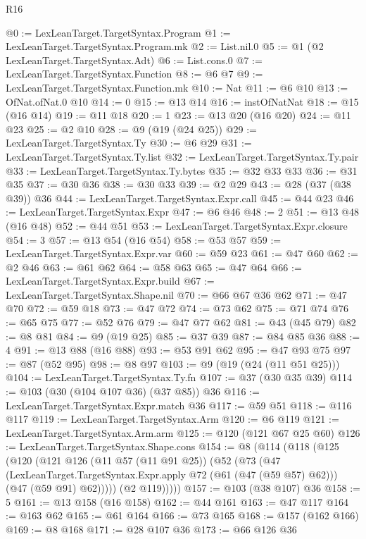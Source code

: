 \begin{lexlean}{R16}
\begin{coremodule}
@0 := LexLeanTarget.TargetSyntax.Program
@1 := LexLeanTarget.TargetSyntax.Program.mk
@2 := List.nil.{0}
@5 := @1 (@2 LexLeanTarget.TargetSyntax.Adt)
@6 := List.cons.{0}
@7 := LexLeanTarget.TargetSyntax.Function
@8 := @6 @7
@9 := LexLeanTarget.TargetSyntax.Function.mk
@10 := Nat
@11 := @6 @10
@13 := OfNat.ofNat.{0} @10
@14 := 0
@15 := @13 @14
@16 := instOfNatNat
@18 := @15 (@16 @14)
@19 := @11 @18
@20 := 1
@23 := @13 @20 (@16 @20)
@24 := @11 @23
@25 := @2 @10
@28 := @9 (@19 (@24 @25))
@29 := LexLeanTarget.TargetSyntax.Ty
@30 := @6 @29
@31 := LexLeanTarget.TargetSyntax.Ty.list
@32 := LexLeanTarget.TargetSyntax.Ty.pair
@33 := LexLeanTarget.TargetSyntax.Ty.bytes
@35 := @32 @33 @33
@36 := @31 @35
@37 := @30 @36
@38 := @30 @33
@39 := @2 @29
@43 := @28 (@37 (@38 @39)) @36
@44 := LexLeanTarget.TargetSyntax.Expr.call
@45 := @44 @23
@46 := LexLeanTarget.TargetSyntax.Expr
@47 := @6 @46
@48 := 2
@51 := @13 @48 (@16 @48)
@52 := @44 @51
@53 := LexLeanTarget.TargetSyntax.Expr.closure
@54 := 3
@57 := @13 @54 (@16 @54)
@58 := @53 @57
@59 := LexLeanTarget.TargetSyntax.Expr.var
@60 := @59 @23
@61 := @47 @60
@62 := @2 @46
@63 := @61 @62
@64 := @58 @63
@65 := @47 @64
@66 := LexLeanTarget.TargetSyntax.Expr.build
@67 := LexLeanTarget.TargetSyntax.Shape.nil
@70 := @66 @67 @36 @62
@71 := @47 @70
@72 := @59 @18
@73 := @47 @72
@74 := @73 @62
@75 := @71 @74
@76 := @65 @75
@77 := @52 @76
@79 := @47 @77 @62
@81 := @43 (@45 @79)
@82 := @8 @81
@84 := @9 (@19 @25)
@85 := @37 @39
@87 := @84 @85 @36
@88 := 4
@91 := @13 @88 (@16 @88)
@93 := @53 @91 @62
@95 := @47 @93 @75
@97 := @87 (@52 @95)
@98 := @8 @97
@103 := @9 (@19 (@24 (@11 @51 @25)))
@104 := LexLeanTarget.TargetSyntax.Ty.fn
@107 := @37 (@30 @35 @39)
@114 := @103 (@30 (@104 @107 @36) (@37 @85)) @36
@116 := LexLeanTarget.TargetSyntax.Expr.match @36
@117 := @59 @51
@118 := @116 @117
@119 := LexLeanTarget.TargetSyntax.Arm
@120 := @6 @119
@121 := LexLeanTarget.TargetSyntax.Arm.arm
@125 := @120 (@121 @67 @25 @60)
@126 := LexLeanTarget.TargetSyntax.Shape.cons
@154 := @8
    (@114
      (@118
        (@125
          (@120
            (@121
              @126
              (@11 @57 (@11 @91 @25))
              (@52
                (@73
                  (@47
                    (LexLeanTarget.TargetSyntax.Expr.apply @72 (@61 (@47 (@59 @57) @62)))
                    (@47 (@59 @91) @62)))))
            (@2 @119)))))
@157 := @103 (@38 @107) @36
@158 := 5
@161 := @13 @158 (@16 @158)
@162 := @44 @161
@163 := @47 @117
@164 := @163 @62
@165 := @61 @164
@166 := @73 @165
@168 := @157 (@162 @166)
@169 := @8 @168
@171 := @28 @107 @36
@173 := @66 @126 @36

\end{coremodule}
\end{lexlean}
